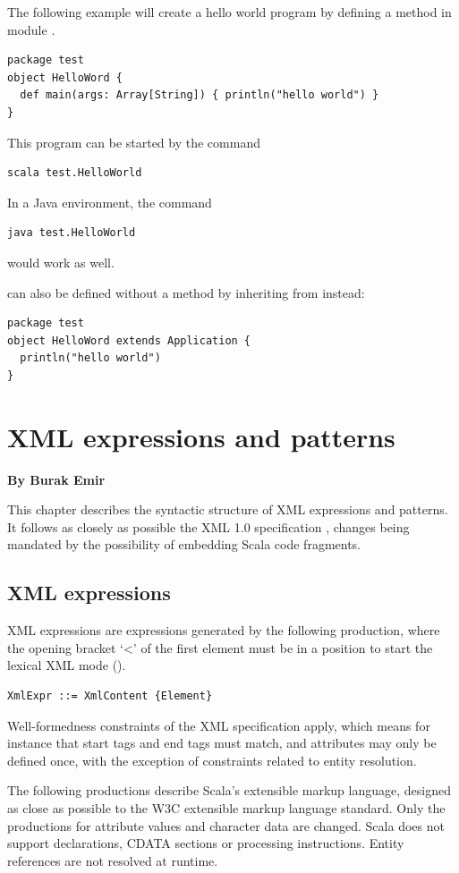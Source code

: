 \example The following example will create a hello world program by defining
a method  in module .
\begin{lstlisting}
package test
object HelloWord {
  def main(args: Array[String]) { println("hello world") }
}
\end{lstlisting}

This program can be started by the command
\begin{lstlisting}
scala test.HelloWorld
\end{lstlisting}
In a Java environment, the command
\begin{lstlisting}
java test.HelloWorld
\end{lstlisting}
would work as well. 

 can also be defined without a  method 
by inheriting from  instead:
\begin{lstlisting}
package test 
object HelloWord extends Application {
  println("hello world")
}
\end{lstlisting}

\chapter{XML expressions and patterns}

{\bf By Burak Emir}\bigskip\bigskip


This chapter describes the syntactic structure of XML expressions and patterns.
It follows as closely as possible the XML 1.0 specification \cite{w3c:xml},
changes being mandated by the possibility of embedding Scala code fragments.

\section{XML expressions}
XML expressions are expressions generated by the following production, where the 
opening bracket `<' of the first element must be in a position to start the lexical
XML mode ().

\syntax\begin{lstlisting}
XmlExpr ::= XmlContent {Element}
\end{lstlisting}
Well-formedness constraints of the XML specification apply, which
means for instance that start tags and end tags must match, and
attributes may only be defined once, with the exception of constraints
related to entity resolution.

The following productions describe Scala's extensible markup language,
designed as close as possible to the W3C extensible markup language
standard. Only the productions for attribute values and character data
are changed. Scala does not support declarations, CDATA
sections or processing instructions. Entity references are not
resolved at runtime.

